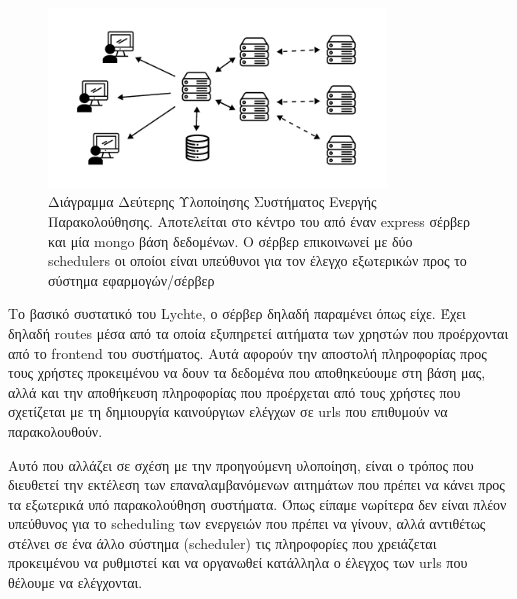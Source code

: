 \begin{figure}[!ht]
	\centering
	\includegraphics[width=0.8\textwidth]{./images/chapter4/lychte-second-implementation.png}
	\caption[Διάγραμμα δεύτερης Υλοποίησης]{Διάγραμμα Δεύτερης Υλοποίησης Συστήματος Ενεργής Παρακολούθησης. Αποτελείται στο κέντρο του από έναν express σέρβερ και μία mongo βάση δεδομένων. Ο σέρβερ επικοινωνεί με δύο schedulers οι οποίοι είναι υπεύθυνοι για τον έλεγχο εξωτερικών προς το σύστημα εφαρμογών/σέρβερ}
	\label{fig:second_implementaion}
\end{figure}

Το βασικό συστατικό του Lychte, ο σέρβερ δηλαδή παραμένει όπως είχε. Έχει δηλαδή routes μέσα από τα οποία εξυπηρετεί αιτήματα
των χρηστών που προέρχονται από το frontend του συστήματος. Αυτά αφορούν την αποστολή πληροφορίας προς τους χρήστες προκειμένου να δουν
τα δεδομένα που αποθηκεύουμε στη βάση μας, αλλά και την αποθήκευση πληροφορίας που προέρχεται από τους χρήστες που σχετίζεται με τη δημιουργία
καινούργιων ελέγχων σε urls που επιθυμούν να παρακολουθούν.

Αυτό που αλλάζει σε σχέση με την προηγούμενη υλοποίηση, είναι ο τρόπος που διευθετεί
την εκτέλεση των επαναλαμβανόμενων αιτημάτων που πρέπει να κάνει προς τα εξωτερικά υπό παρακολούθηση συστήματα.
Όπως είπαμε νωρίτερα δεν είναι πλέον υπεύθυνος για το scheduling των ενεργειών που πρέπει να γίνουν, 
αλλά αντιθέτως στέλνει σε ένα άλλο σύστημα (scheduler) τις πληροφορίες που χρειάζεται προκειμένου να ρυθμιστεί και να οργανωθεί κατάλληλα
 ο έλεγχος των urls που θέλουμε να ελέγχονται.

